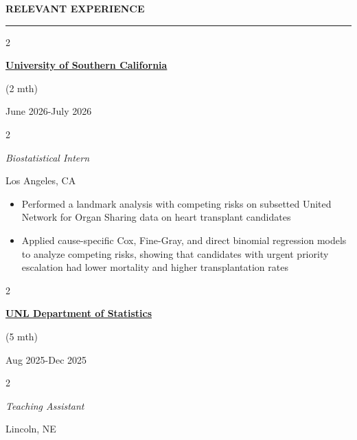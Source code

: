 \documentclass[
  16,
]{article}
\providecommand{\tightlist}{%
  \setlength{\itemsep}{0pt}\setlength{\parskip}{0pt}}
\begin{document}
\begin{large}{\bf RELEVANT EXPERIENCE}
  \vspace{3pt}
  \hrule
  \begin{multicols}{2}
    \begin{flushleft}{\bf \href{https://lasbest.usc.edu}{University of Southern California}}\end{flushleft}
    \begin{flushright}
    \begin{small}(2 mth)\end{small}
    June 2026-July 2026\end{flushright}
  \end{multicols}
  \vspace{-0.17cm}
  \begin{multicols}{2}
    \begin{flushleft}\textit{Biostatistical Intern}\end{flushleft}
    \begin{flushright}Los Angeles, CA\end{flushright}\end{multicols}
\end{large}
\vspace{-0.16cm}

\begin{itemize}
\tightlist
\item
  Performed a landmark analysis with competing risks on subsetted United
  Network for Organ Sharing data on heart transplant candidates
\item
  Applied cause-specific Cox, Fine-Gray, and direct binomial regression
  models to analyze competing risks, showing that candidates with urgent
  priority escalation had lower mortality and higher transplantation
  rates
\end{itemize}

\vspace{3pt}

\begin{large}
  \begin{multicols}{2}
    \begin{flushleft}{\bf \href{https://statistics.unl.edu}{UNL Department of Statistics}}\end{flushleft}
    \begin{flushright}
    \begin{small}(5 mth)\end{small}
    Aug 2025-Dec 2025\end{flushright}
  \end{multicols}
  \vspace{-0.17cm}
  \begin{multicols}{2}
    \begin{flushleft}\textit{Teaching Assistant}\end{flushleft}
    \begin{flushright}Lincoln, NE\end{flushright}\end{multicols}
\end{large}
\vspace{-0.16cm}
\end{document}
